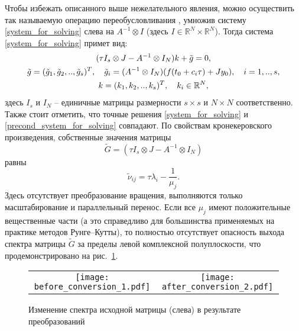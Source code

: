\documentclass[a4paper, 14pt]{extreport} %
\begin{document}
Чтобы  избежать описанного выше нежелательного явления, можно осуществить так называемую операцию переобусловливания \cite{gomel},\cite{konf_may}  умножив систему \eqref{system_for_solving} слева на $A^{-1}\otimes I$ (здесь $I\in \mathbb{R}^N \times \mathbb{R}^N $). Тогда система \eqref{system_for_solving} примет вид:
\begin{gather}\label{precond_system_for_solving}
(\tau I_s\otimes J-A^{-1}\otimes I_N)k+\tilde g=0,\\
\notag \tilde g=(\tilde g_1,\tilde g_2,..,\tilde g_s)^T, \quad \tilde g_i=(A^{-1}\otimes I_N)(f(t_0+c_i \tau)+Jy_0), \quad i=1,..,s,\\
\notag k=(k_1,k_2,..,k_s)^T, \quad k_i \in \mathbb{R}^N,
\end{gather}
здесь $I_s$ и $I_N$ -- единичные матрицы размерности $s\times s$ и
$N \times N$ соответственно. Также стоит отметить, что точные
решения \eqref{system_for_solving} и
\eqref{precond_system_for_solving} совпадают. По свойствам
кронекеровского произведения, собственные значения
матрицы
$$\tilde G =(\tau I_s\otimes J-A^{-1}\otimes I_N) $$
равны
$$\tilde \nu_{ij} = \tau \lambda_i - \frac{1}{ \mu_j}.$$
Здесь отсутствует преобразование вращения, выполняются только
масштабирование и параллельный перенос.  Если все $\mu_j$ имеют
положительные вещественные части (а это справедливо для большинства
применяемых на практике методов Рунге--Кутты), то полностью
отсутствует опасность выхода спектра матрицы $\tilde G$ за пределы
левой комплексной полуплоскости, что продемонстрировано на
рис.~\ref{good_conversion}.
\begin{figure}
\begin{center}
\begin{tabular}{cc}
 \texttt{[image: before\_conversion\_1.pdf]}&\texttt{[image: after\_conversion\_2.pdf]}
\end{tabular}
\end{center}
\caption{\small Изменение спектра исходной матрицы (слева) в результате преобразований}
\label{good_conversion}
\end{figure}
\end{document}
